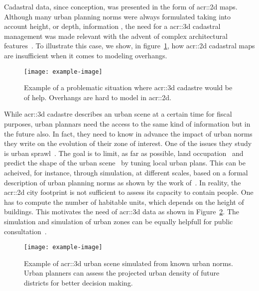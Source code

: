         Cadastral data, since conception, was presented in the form of \gls{acr::2d} maps\addref.
        Although many urban planning norms were always formulated taking into account height, or depth, information \addref, the need for a \gls{acr::3d} cadastral management was made relevant with the advent of complex architectural features~\textcite{ijgi4042842}.
        To illustrate this case, we show, in figure~\ref{fig::3d_cadastre_need_example}, how \gls{acr::2d} cadastral maps are insufficient when it comes to modeling overhangs.
        \\
        \begin{figure}[h]
            \centering
            \texttt{[image: example-image]}             
            \caption{\label{fig::3d_cadastre_need_example} Example of a problematic situation where \gls{acr::3d} cadastre would be of help. Overhangs are hard to model in \gls{acr::2d}.}
        \end{figure}
        While \gls{acr::3d} cadastre describes an urban scene at a certain time for fiscal purposes, urban plannars need the access to the same kind of information but in the future also.
        In fact, they need to know in advance the impact of urban norms they write on the evolution of their zone of interest.  
        One of the issues they study is urban sprawl~\parencite{ludlow2006urban}.
        The goal is to limit, as far as possible, land occupation~\parencite{TANNIER2012128} and predict the shape of the urban scene~\parencite{brasebin20183d} by tuning local urban plans.
        This can be acheived, for instance, through simulation, at different scales, based on a formal description of urban planning norms as shown by the work of~\textcite{Colomb17a}.
        In reality, the \gls{acr::2d} city footprint is not sufficient to assess its capacity to contain people.
        One has to compute the number of habitable units, which depends on the height of buildings.
        This motivates the need of \gls{acr::3d} data as shown in Figure~\ref{fig::3d_simulation}.
        The simulation and simulation of urban zones can be equally helpfull for public consultation~\parencite{WU2010291}.\\
        \begin{figure}[h]
            \centering
            \texttt{[image: example-image]}             
            \caption{
                \label{fig::3d_simulation} Example of \gls{acr::3d} urban scene simulated from known urban norms.
                Urban planners can assess the projected urban density of future districts for better decision making.
            }
        \end{figure}

